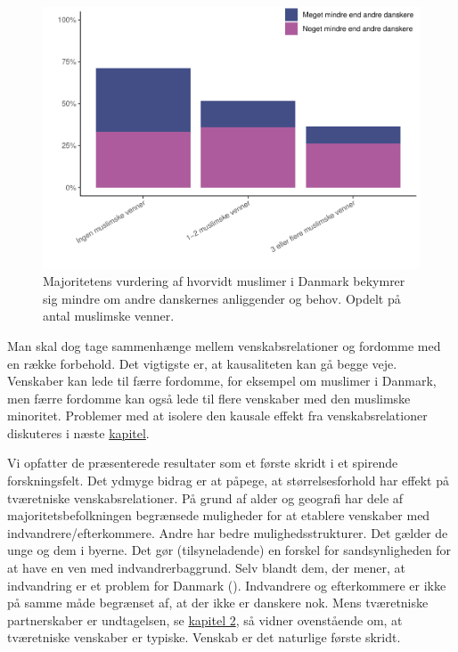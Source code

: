 \documentclass[
]{book}
\begin{document}
\begin{figure}
\includegraphics[width=1\linewidth]{en-befolkning-blander-sig_files/figure-latex/fig-6-5-1} \caption{Majoritetens vurdering af hvorvidt muslimer i Danmark bekymrer sig mindre om andre danskernes anliggender og behov. Opdelt på antal muslimske venner.}\label{fig:fig-6-5}
\end{figure}

Man skal dog tage sammenhænge mellem venskabsrelationer og fordomme med en række forbehold. Det vigtigste er, at kausaliteten kan gå begge veje. Venskaber kan lede til færre fordomme, for eksempel om muslimer i Danmark, men færre fordomme kan også lede til flere venskaber med den muslimske minoritet. Problemer med at isolere den kausale effekt fra venskabsrelationer diskuteres i næste \hyperref[kap7]{kapitel}.

Vi opfatter de præsenterede resultater som et første skridt i et spirende forskningsfelt. Det ydmyge bidrag er at påpege, at størrelsesforhold har effekt på tværetniske venskabsrelationer. På grund af alder og geografi har dele af majoritetsbefolkningen begrænsede muligheder for at etablere venskaber med indvandrere/efterkommere. Andre har bedre mulighedsstrukturer. Det gælder de unge og dem i byerne. Det gør (tilsyneladende) en forskel for sandsynligheden for at have en ven med indvandrerbaggrund. Selv blandt dem, der mener, at indvandring er et problem for Danmark (). Indvandrere og efterkommere er ikke på samme måde begrænset af, at der ikke er danskere nok. Mens tværetniske partnerskaber er undtagelsen, se \hyperref[kap2]{kapitel 2}, så vidner ovenstående om, at tværetniske venskaber er typiske. Venskab er det naturlige første skridt.
\end{document}
